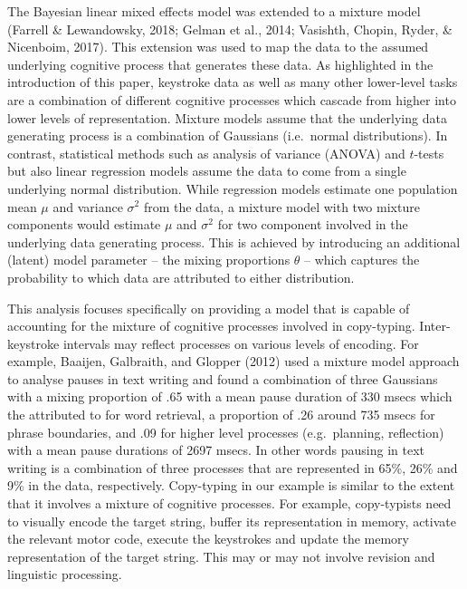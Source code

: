 \documentclass[,man,floatsintext]{apa6}
\begin{document}
The Bayesian linear mixed effects model was extended to a mixture model (Farrell \& Lewandowsky, 2018; Gelman et al., 2014; Vasishth, Chopin, Ryder, \& Nicenboim, 2017). This extension was used to map the data to the assumed underlying cognitive process that generates these data. As highlighted in the introduction of this paper, keystroke data as well as many other lower-level tasks are a combination of different cognitive processes which cascade from higher into lower levels of representation. Mixture models assume that the underlying data generating process is a combination of Gaussians (i.e.~normal distributions). In contrast, statistical methods such as analysis of variance (ANOVA) and \(t\)-tests but also linear regression models assume the data to come from a single underlying normal distribution. While regression models estimate one population mean \(\mu\) and variance \(\sigma^2\) from the data, a mixture model with two mixture components would estimate \(\mu\) and \(\sigma^2\) for two component involved in the underlying data generating process. This is achieved by introducing an additional (latent) model parameter -- the mixing proportions \(\theta\) -- which captures the probability to which data are attributed to either distribution.

This analysis focuses specifically on providing a model that is capable of accounting for the mixture of cognitive processes involved in copy-typing. Inter-keystroke intervals may reflect processes on various levels of encoding. For example, Baaijen, Galbraith, and Glopper (2012) used a mixture model approach to analyse pauses in text writing and found a combination of three Gaussians with a mixing proportion of .65 with a mean pause duration of 330 msecs which the attributed to for word retrieval, a proportion of .26 around 735 msecs for phrase boundaries, and .09 for higher level processes (e.g.~planning, reflection) with a mean pause durations of 2697 msecs. In other words pausing in text writing is a combination of three processes that are represented in 65\%, 26\% and 9\% in the data, respectively. Copy-typing in our example is similar to the extent that it involves a mixture of cognitive processes. For example, copy-typists need to visually encode the target string, buffer its representation in memory, activate the relevant motor code, execute the keystrokes and update the memory representation of the target string. This may or may not involve revision and linguistic processing.
\end{document}
